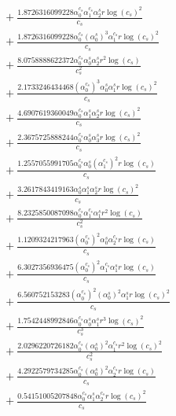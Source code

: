 \documentclass[10pt]{article}
\begin{document}
\begin{align*}
&{}  + \frac{1.8726316099228 \alpha_{0}^{c_s} \alpha_{1}^{c_s} \alpha_{2}^s r \log{\left(c_{s} \right)}^{2}}{c_{s}} \\
&{}  + \frac{1.8726316099228 \alpha_{0}^{c_s} \left(\alpha_{0}^s\right)^{3} \alpha_{1}^{c_s} r \log{\left(c_{s} \right)}^{2}}{c_{s}} \\
&{}  + \frac{8.0758888622372 \alpha_{0}^{c_s} \alpha_{0}^s \alpha_{2}^s r^{2} \log{\left(c_{s} \right)}}{c_{s}^{2}} \\
&{}  + \frac{2.1733246434468 \left(\alpha_{0}^{c_s}\right)^{3} \alpha_{0}^s \alpha_{1}^s r \log{\left(c_{s} \right)}^{2}}{c_{s}} \\
&{}  + \frac{4.6907619360049 \alpha_{0}^{c_s} \alpha_{1}^s \alpha_{2}^s r \log{\left(c_{s} \right)}^{2}}{c_{s}} \\
&{}  + \frac{2.3675725888244 \alpha_{0}^{c_s} \alpha_{0}^s \alpha_{3}^s r \log{\left(c_{s} \right)}^{2}}{c_{s}} \\
&{}  + \frac{1.2557055991705 \alpha_{0}^{c_s} \alpha_{0}^s \left(\alpha_{1}^{c_s}\right)^{2} r \log{\left(c_{s} \right)}}{c_{s}} \\
&{}  + \frac{3.2617843419163 \alpha_{0}^s \alpha_{1}^s \alpha_{2}^s r \log{\left(c_{s} \right)}^{2}}{c_{s}} \\
&{}  + \frac{8.2325850087098 \alpha_{0}^{c_s} \alpha_{1}^{c_s} \alpha_{1}^s r^{2} \log{\left(c_{s} \right)}}{c_{s}^{2}} \\
&{}  + \frac{1.1209324217963 \left(\alpha_{0}^{c_s}\right)^{2} \alpha_{0}^s \alpha_{2}^{c_s} r \log{\left(c_{s} \right)}}{c_{s}} \\
&{}  + \frac{6.3027356936475 \left(\alpha_{0}^{c_s}\right)^{2} \alpha_{1}^{c_s} \alpha_{1}^s r \log{\left(c_{s} \right)}}{c_{s}} \\
&{}  + \frac{6.560752153283 \left(\alpha_{0}^{c_s}\right)^{2} \left(\alpha_{0}^s\right)^{2} \alpha_{1}^s r \log{\left(c_{s} \right)}^{2}}{c_{s}} \\
&{}  + \frac{1.7542448992846 \alpha_{0}^{c_s} \alpha_{0}^s \alpha_{1}^s r^{3} \log{\left(c_{s} \right)}^{2}}{c_{s}^{3}} \\
&{}  + \frac{2.0296220726182 \alpha_{0}^{c_s} \left(\alpha_{0}^s\right)^{2} \alpha_{1}^{c_s} r^{2} \log{\left(c_{s} \right)}^{2}}{c_{s}^{2}} \\
&{}  + \frac{4.2922579734285 \alpha_{0}^{c_s} \left(\alpha_{0}^s\right)^{2} \alpha_{2}^{c_s} r \log{\left(c_{s} \right)}}{c_{s}} \\
&{}  + \frac{0.54151005207848 \alpha_{0}^{c_s} \alpha_{1}^s \alpha_{2}^{c_s} r \log{\left(c_{s} \right)}^{2}}{c_{s}} \\

\end{align*}
\end{document}
